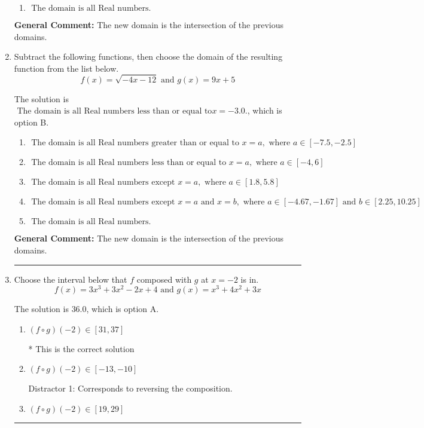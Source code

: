 \documentclass{extbook}[14pt]
\newcommand{\litem}[1]{\item #1

\rule{\textwidth}{0.4pt}}
\begin{document}
\begin{enumerate}
{\begin{enumerate}[label=\Alph*.]
\item \( \text{ The domain is all Real numbers. } \)


\end{enumerate}

\textbf{General Comment:} The new domain is the intersection of the previous domains.
}
\litem{
Subtract the following functions, then choose the domain of the resulting function from the list below.
\[ f(x) = \sqrt{-4x-12}  \text{ and } g(x) = 9x + 5 \]

The solution is \( \text{ The domain is all Real numbers less than or equal to} x = -3.0. \), which is option B.\begin{enumerate}[label=\Alph*.]
\item \( \text{ The domain is all Real numbers greater than or equal to } x = a, \text{ where } a \in [-7.5, -2.5] \)


\item \( \text{ The domain is all Real numbers less than or equal to } x = a, \text{ where } a \in [-4, 6] \)


\item \( \text{ The domain is all Real numbers except } x = a, \text{ where } a \in [1.8, 5.8] \)


\item \( \text{ The domain is all Real numbers except } x = a \text{ and } x = b, \text{ where } a \in [-4.67, -1.67] \text{ and } b \in [2.25, 10.25] \)


\item \( \text{ The domain is all Real numbers. } \)


\end{enumerate}

\textbf{General Comment:} The new domain is the intersection of the previous domains.
}
\litem{
Choose the interval below that $f$ composed with $g$ at $x=-2$ is in.
\[ f(x) = 3x^{3} +3 x^{2} -2 x + 4 \text{ and } g(x) = x^{3} +4 x^{2} +3 x \]

The solution is \( 36.0 \), which is option A.\begin{enumerate}[label=\Alph*.]
\item \( (f \circ g)(-2) \in [31, 37] \)

* This is the correct solution
\item \( (f \circ g)(-2) \in [-13, -10] \)

 Distractor 1: Corresponds to reversing the composition.
\item \( (f \circ g)(-2) \in [19, 29] \)


\end{enumerate}}
\end{enumerate}
\end{document}
